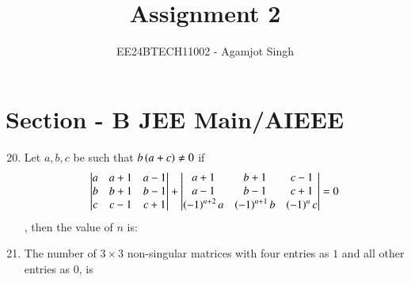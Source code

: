\documentclass[journal,12pt,twocolumn]{IEEEtran}
\theoremstyle{remark}
\begin{document}

\vspace{3cm}

\title{Assignment 2}
\author{EE24BTECH11002 - Agamjot Singh}
\maketitle
\newpage
\bigskip

\renewcommand{\thefigure}{\theenumi}
\renewcommand{\thetable}{\theenumi}
\section*{Section - B JEE Main/AIEEE}
\begin{enumerate}
    \setcounter{enumi}{19}

    \item Let $a,b,c$ be such that $b\left(a+c\right)\neq0$ if
	\begin{align*}
		\begin{vmatrix}
			a & a+1 & a-1\\
			b & b+1 & b-1\\
			c & c-1 & c+1\\
		\end{vmatrix}
		+
		\begin{vmatrix}
			a+1 & b+1 & c-1\\
			a-1 & b-1 & c+1\\
			\left(-1\right)^{n+2}a & \left(-1\right)^{n+1}b & \left(-1\right)^{n}c\\
		\end{vmatrix}	
		= 0
	\end{align*},
		then the value of $n$ is:
	\hfill{}
	\begin{enumerate}

	\end{enumerate}

    \item The number of $3\times3$ non-singular matrices with four entries as $1$ and all other entries as $0$, is 
	\hfill{}{\par}



\end{enumerate}
\end{document}
